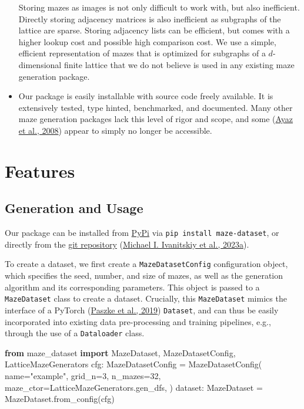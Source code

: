 \documentclass[10pt,a4paper,onecolumn]{article}
\newenvironment{Shaded}{}{}
\newcommand{\DecValTok}[1]{\textcolor[rgb]{0.25,0.63,0.44}{#1}}
\newcommand{\ImportTok}[1]{\textcolor[rgb]{0.00,0.50,0.00}{\textbf{#1}}}
\newcommand{\NormalTok}[1]{#1}
\newcommand{\OperatorTok}[1]{\textcolor[rgb]{0.40,0.40,0.40}{#1}}
\newcommand{\StringTok}[1]{\textcolor[rgb]{0.25,0.44,0.63}{#1}}
\begin{document}
\begin{itemize}
  Storing mazes as images is not only difficult to work with, but also
  inefficient. Directly storing adjacency matrices is also inefficient
  as subgraphs of the lattice are sparse. Storing adjacency lists can be
  efficient, but comes with a higher lookup cost and possible high
  comparison cost. We use a simple, efficient representation of mazes
  that is optimized for subgraphs of a \(d\)-dimensional finite lattice
  that we do not believe is used in any existing maze generation
  package.
\item
  Our package is easily installable with source code freely available.
  It is extensively tested, type hinted, benchmarked, and documented.
  Many other maze generation packages lack this level of rigor and
  scope, and some (\protect\hyperlink{ref-ayaz2008maze}{Ayaz et al.,
  2008}) appear to simply no longer be accessible.
\end{itemize}

\hypertarget{features}{%
\section{Features}\label{features}}

\hypertarget{generation}{%
\subsection{Generation and Usage}\label{generation}}

Our package can be installed from
\href{https://pypi.org/project/maze-dataset/}{PyPi} via
\texttt{pip\ install\ maze-dataset}, or directly from the
\href{https://github.com/understanding-search/maze-dataset}{git
repository} (\protect\hyperlink{ref-maze-dataset-github}{Michael I.
Ivanitskiy et al., 2023a}).

To create a dataset, we first create a \texttt{MazeDatasetConfig}
configuration object, which specifies the seed, number, and size of
mazes, as well as the generation algorithm and its corresponding
parameters. This object is passed to a \texttt{MazeDataset} class to
create a dataset. Crucially, this \texttt{MazeDataset} mimics the
interface of a PyTorch (\protect\hyperlink{ref-pytorch}{Paszke et al.,
2019}) \texttt{Dataset}, and can thus be easily incorporated into
existing data pre-processing and training pipelines, e.g., through the
use of a \texttt{Dataloader} class.

\begin{Shaded}
\begin{Highlighting}[]
\ImportTok{from}\NormalTok{ maze\_dataset }\ImportTok{import}\NormalTok{ MazeDataset, MazeDatasetConfig, LatticeMazeGenerators}
\NormalTok{cfg: MazeDatasetConfig }\OperatorTok{=}\NormalTok{ MazeDatasetConfig(}
\NormalTok{    name}\OperatorTok{=}\StringTok{"example"}\NormalTok{, }
\NormalTok{    grid\_n}\OperatorTok{=}\DecValTok{3}\NormalTok{, }
\NormalTok{    n\_mazes}\OperatorTok{=}\DecValTok{32}\NormalTok{, }
\NormalTok{    maze\_ctor}\OperatorTok{=}\NormalTok{LatticeMazeGenerators.gen\_dfs,}
\NormalTok{)}
\NormalTok{dataset: MazeDataset }\OperatorTok{=}\NormalTok{ MazeDataset.from\_config(cfg)}
\end{Highlighting}
\end{Shaded}
\end{document}
